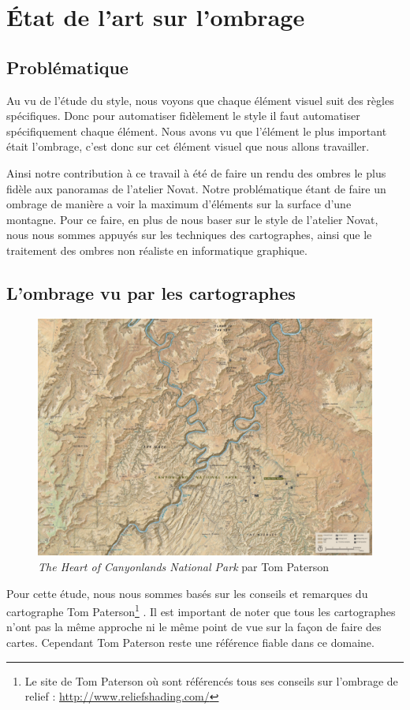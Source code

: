 \chapter{État de l'art sur l'ombrage}
\section{Problématique}


Au vu de l'étude du style, nous voyons que chaque élément visuel suit des règles spécifiques. Donc pour automatiser fidèlement le style il faut automatiser spécifiquement chaque élément. Nous avons vu que l'élément le plus important était l'ombrage, c'est donc sur cet élément visuel que nous allons travailler. 

Ainsi notre contribution à ce travail à été de faire un rendu des ombres le plus fidèle aux panoramas de l'atelier Novat. Notre problématique étant de faire un ombrage de manière a voir la maximum d’éléments sur la surface d'une montagne. Pour ce faire, en plus de nous baser sur le style de l'atelier Novat, nous nous sommes appuyés sur les techniques des cartographes, ainsi que le traitement des ombres non réaliste en informatique graphique. 

\section{L'ombrage vu par les cartographes}

\begin{figure}[!h]
	\centering
 	\includegraphics[width=0.7\linewidth]{Etat_de_l_art/carte_Paterson.png}
 	\caption{\textit{The Heart of Canyonlands National Park} par Tom Paterson}
\end{figure}
Pour cette étude, nous nous sommes basés sur les conseils et remarques du cartographe Tom Paterson\footnote{Le site de Tom Paterson où sont référencés tous ses conseils sur l'ombrage de relief : \url{http://www.reliefshading.com/}} \cite{patterson2000view}\cite{patterson2005looking}. Il est important de noter que tous les cartographes n'ont pas la même approche ni le même point de vue sur la façon de faire des cartes. Cependant Tom Paterson reste une référence fiable dans ce domaine.

